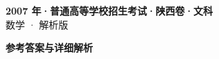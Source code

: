 \documentclass[zihao=-4, a4paper]{ctexart}
\begin{document}
\begin{center}
  {\Large\bfseries 2007 年·普通高等学校招生考试·陕西卷·文科}\\[4pt]
  {\large 数学 · 解析版}
\end{center}
\medskip
{}

\clearpage
{}
\begin{center}{\Large\bfseries 参考答案与详细解析}\end{center}
\medskip

\end{document}
